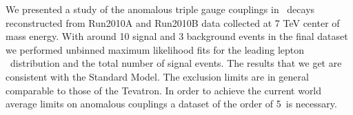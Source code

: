
We presented a study of the anomalous triple gauge couplings in \wwll\
decays reconstructed from Run2010A and Run2010B data collected at 7
TeV center of mass energy. With around 10 signal and 3 background
events in the final dataset we performed unbinned maximum likelihood
fits for the leading lepton \pt\ distribution and the total number of
signal events. The results that we get are consistent with the
Standard Model. The exclusion limits are in general comparable to those
of the Tevatron. In order to achieve the
current world average limits on anomalous couplings a dataset of the
order of 5~\ifb is necessary.
